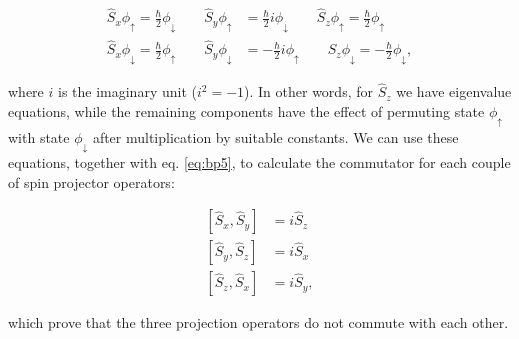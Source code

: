 \documentclass[
  9pt,
]{extbook}
\theoremstyle{definition}
\theoremstyle{definition}
\theoremstyle{definition}
\theoremstyle{remark}
\begin{document}
\begin{equation}
\begin{aligned}
\hat{S}_x \phi_{\uparrow} =  \frac{\hbar}{2} \phi_{\downarrow} \qquad \hat{S}_y \phi_{\uparrow} &=  \frac{\hbar}{2} i \phi_{\downarrow} \qquad \hat{S}_z \phi_{\uparrow} =  \frac{\hbar}{2} \phi_{\uparrow} \\
\hat{S}_x \phi_{\downarrow} =  \frac{\hbar}{2} \phi_{\uparrow} \qquad \hat{S}_y \phi_{\downarrow} &=  - \frac{\hbar}{2} i \phi_{\uparrow} \qquad \hat{S}_z \phi_{\downarrow} =  -\frac{\hbar}{2} \phi_{\downarrow},
\end{aligned}
\label{eq:spop2}  
\end{equation}

where \(i\) is the imaginary unit (\(i^2=-1\)). In other words, for \(\hat{S}_z\) we have eigenvalue equations, while the remaining components have the effect of permuting state \(\phi_{\uparrow}\) with state \(\phi_{\downarrow}\) after multiplication by suitable constants. We can use these equations, together with eq. \eqref{eq:bp5}, to calculate the commutator for each couple of spin projector operators:

\begin{equation}
\begin{aligned}
\left[\hat{S}_x, \hat{S}_y\right] &= i\hat{S}_z \\
\left[\hat{S}_y, \hat{S}_z\right] &= i\hat{S}_x \\
\left[\hat{S}_z, \hat{S}_x\right] &= i\hat{S}_y,
\end{aligned}
\label{eq:spop3}  
\end{equation}

which prove that the three projection operators do not commute with each other.
\end{document}
